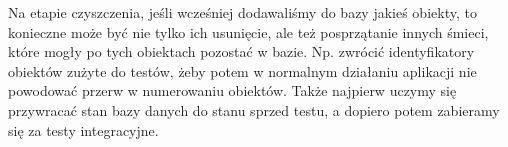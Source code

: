 \documentclass[10pt]{article}
\begin{document}
Na etapie czyszczenia, jeśli wcześniej dodawaliśmy do bazy jakieś obiekty, to konieczne może być nie tylko ich usunięcie, ale też posprzątanie innych śmieci, które mogły po tych obiektach pozostać w bazie. Np. zwrócić identyfikatory obiektów zużyte do testów, żeby potem w normalnym działaniu aplikacji nie powodować przerw w numerowaniu obiektów. Także najpierw uczymy się przywracać stan bazy danych do stanu sprzed testu, a dopiero potem zabieramy się za testy integracyjne.
\end{document}
